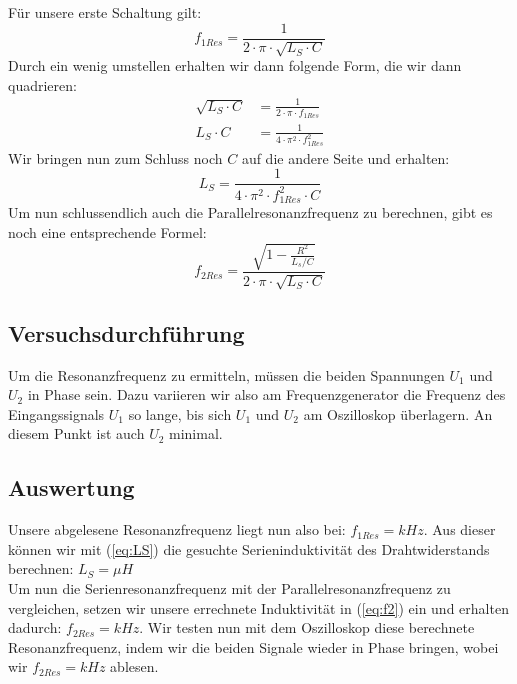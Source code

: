 \documentclass{article}
\begin{document}
Für unsere erste Schaltung gilt:
\begin{equation}
  f_{1Res} = \frac{1}{2\cdot \pi \cdot \sqrt{L_S \cdot C}}
\end{equation}
Durch ein wenig umstellen erhalten wir dann folgende Form, die wir dann quadrieren:
\begin{align*}
  \sqrt{L_S\cdot C} & = \frac{1}{2\cdot\pi \cdot f_{1Res}}    \\
  L_S \cdot C       & = \frac{1}{4\cdot\pi^2\cdot f_{1Res}^2}
\end{align*}
Wir bringen nun zum Schluss noch $C$ auf die andere Seite und erhalten:
\begin{equation}\label{eq:LS}
  L_S = \frac{1}{4\cdot\pi^2\cdot f_{1Res}^2\cdot C}
\end{equation}
Um nun schlussendlich auch die Parallelresonanzfrequenz zu berechnen, gibt es noch eine entsprechende Formel:
\begin{equation}\label{eq:f2}
  f_{2Res} = \frac{\sqrt{1-\frac{R^2}{L_s/C}}}{2\cdot\pi\cdot\sqrt{L_S\cdot C}}
\end{equation}
\subsection{Versuchsdurchführung}
Um die Resonanzfrequenz zu ermitteln, müssen die beiden Spannungen $U_1$ und $U_2$ in Phase sein.
Dazu variieren wir also am Frequenzgenerator die Frequenz des Eingangssignals $U_1$ so lange, bis sich
$U_1$ und $U_2$ am Oszilloskop überlagern. An diesem Punkt ist auch $U_2$ minimal.

\subsection{Auswertung}

Unsere abgelesene Resonanzfrequenz liegt nun also bei: $f_{1Res} = kHz$.
Aus dieser können wir mit (\ref{eq:LS}) die gesuchte Serieninduktivität des Drahtwiderstands berechnen: $L_S = \mu H$\\[3pt]
Um nun die Serienresonanzfrequenz mit der Parallelresonanzfrequenz zu vergleichen, setzen wir unsere errechnete Induktivität in
(\ref{eq:f2}) ein und erhalten dadurch: $f_{2Res} = kHz$. Wir testen nun mit dem Oszilloskop diese berechnete Resonanzfrequenz, indem wir
die beiden Signale wieder in Phase bringen, wobei wir $f_{2Res} = kHz$ ablesen.


\newpage
\end{document}
